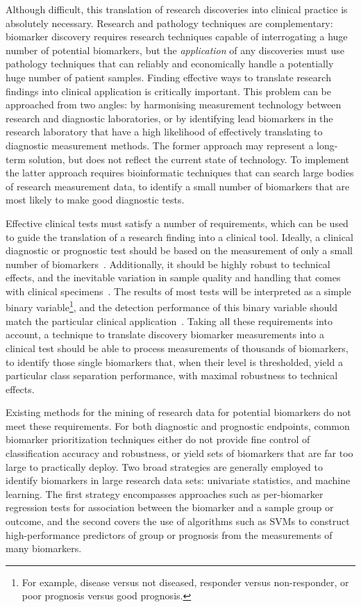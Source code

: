 \documentclass[dissertation.tex]{subfiles}
\begin{document}
Although difficult, this translation of research discoveries into clinical practice is absolutely necessary.  Research and pathology techniques are complementary: biomarker discovery requires research techniques capable of interrogating a huge number of potential biomarkers, but the \emph{application} of any discoveries must use pathology techniques that can reliably and economically handle a potentially huge number of patient samples.  Finding effective ways to translate research findings into clinical application is critically important.  This problem can be approached from two angles: by harmonising measurement technology between research and diagnostic laboratories, or by identifying lead biomarkers in the research laboratory that have a high likelihood of effectively translating to diagnostic measurement methods.  The former approach may represent a long-term solution, but does not reflect the current state of technology.  To implement the latter approach requires bioinformatic techniques that can search large bodies of research measurement data, to identify a small number of biomarkers that are most likely to make good diagnostic tests.

Effective clinical tests must satisfy a number of requirements, which can be used to guide the translation of a research finding into a clinical tool.  Ideally, a clinical diagnostic or prognostic test should be based on the measurement of only a small number of biomarkers~\cite{Lesko2001, Pepe2001}.  Additionally, it should be highly robust to technical effects, and the inevitable variation in sample quality and handling that comes with clinical specimens~\cite{Hewitt2008}.  The results of most tests will be interpreted as a simple binary variable\footnote{For example, disease versus not diseased, responder versus non-responder, or poor prognosis versus good prognosis.}, and the detection performance of this binary variable should match the particular clinical application~\cite{Pepe2001}.  Taking all these requirements into account, a technique to translate discovery biomarker measurements into a clinical test should be able to process measurements of thousands of biomarkers, to identify those single biomarkers that, when their level is thresholded, yield a particular class separation performance, with maximal robustness to technical effects.

Existing methods for the mining of research data for potential biomarkers do not meet these requirements.  For both diagnostic and prognostic endpoints, common biomarker prioritization techniques either do not provide fine control of classification accuracy and robustness, or yield sets of biomarkers that are far too large to practically deploy.  Two broad strategies are generally employed to identify biomarkers in large research data sets: univariate statistics, and machine learning.  The first strategy encompasses approaches such as per-biomarker regression tests for association between the biomarker and a sample group or outcome, and the second covers the use of algorithms such as \glspl{SVM} to construct high-performance predictors of group or prognosis from the measurements of many biomarkers.
\end{document}
